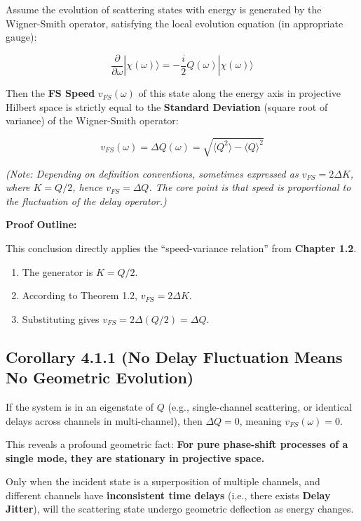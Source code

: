 \documentclass[11pt,a4paper,twoside]{book}
\begin{document}
Assume the evolution of scattering states with energy is generated by the Wigner-Smith operator, satisfying the local evolution equation (in appropriate gauge):

$$\frac{\partial}{\partial \omega} |\chi(\omega)\rangle = -\frac{i}{2} Q(\omega) |\chi(\omega)\rangle$$

Then the \textbf{FS Speed} $v_{FS}(\omega)$ of this state along the energy axis in projective Hilbert space is strictly equal to the \textbf{Standard Deviation} (square root of variance) of the Wigner-Smith operator:

$$v_{FS}(\omega) = \Delta Q(\omega) = \sqrt{\langle Q^2 \rangle - \langle Q \rangle^2}$$

\textit{(Note: Depending on definition conventions, sometimes expressed as $v_{FS} = 2\Delta K$, where $K=Q/2$, hence $v_{FS}=\Delta Q$. The core point is that speed is proportional to the fluctuation of the delay operator.)}

\textbf{Proof Outline:}

This conclusion directly applies the ``speed-variance relation'' from \textbf{Chapter 1.2}.

\begin{enumerate}
\item The generator is $K = Q/2$.

\item According to Theorem 1.2, $v_{FS} = 2\Delta K$.

\item Substituting gives $v_{FS} = 2\Delta(Q/2) = \Delta Q$.
\end{enumerate}

\subsection{Corollary 4.1.1 (No Delay Fluctuation Means No Geometric Evolution)}

If the system is in an eigenstate of $Q$ (e.g., single-channel scattering, or identical delays across channels in multi-channel), then $\Delta Q = 0$, meaning $v_{FS}(\omega) = 0$.

This reveals a profound geometric fact: \textbf{For pure phase-shift processes of a single mode, they are stationary in projective space.}

Only when the incident state is a superposition of multiple channels, and different channels have \textbf{inconsistent time delays} (i.e., there exists \textbf{Delay Jitter}), will the scattering state undergo geometric deflection as energy changes.
\end{document}
